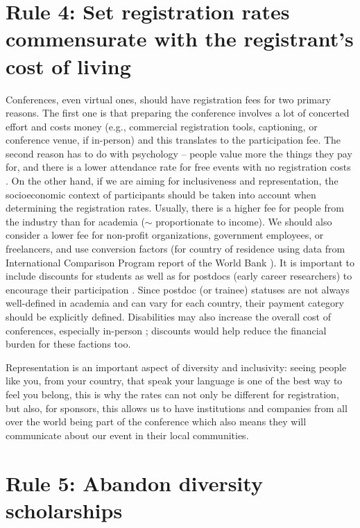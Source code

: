 \documentclass[10pt,letterpaper]{article}
\begin{document}
\section*{Rule 4: Set registration rates commensurate with the registrant's cost of living}

Conferences, even virtual ones, should have registration fees for two primary reasons. The first one is that preparing the conference involves a lot of concerted effort and costs money (e.g., commercial registration tools, captioning, or conference venue, if in-person) and this translates to the participation fee. The second reason has to do with psychology -- people value more the things they pay for, and there is a lower attendance rate for free events with no registration costs \cite{eventbrite_ultimate_2017}. On the other hand, if we are aiming for inclusiveness and representation, the socioeconomic context of participants should be taken into account when determining the registration rates. Usually, there is a higher fee for people from the industry than for academia ($\sim$ proportionate to income). We should also consider a lower fee for non-profit organizations, government employees, or freelancers, and use conversion factors (for country of residence using data from International Comparison Program report of the World Bank \cite{arend_disparity_2019}). It is important to include discounts for students as well as for postdocs (early career researchers) to encourage their participation \cite{sarabipour_evaluating_2020, andalib_postdoc_2018, kaplan_postdoc_2012}. Since postdoc (or trainee) statuses are not always well-defined in academia and can vary for each country, their payment category should be explicitly defined. Disabilities may also increase the overall cost of conferences, especially in-person \cite{de_picker_rethinking_2020, irish_increasing_2020}; discounts would help reduce the financial burden for these factions too.

Representation is an important aspect of diversity and inclusivity: seeing people like you, from your country, that speak your language is one of the best way to feel you belong, this is why the rates can not only be different for registration, but also, for sponsors, this allows us to have institutions and companies from all over the world being part of the conference which also means they will communicate about our event in their local communities.


\section*{Rule 5: Abandon diversity scholarships}
\end{document}
